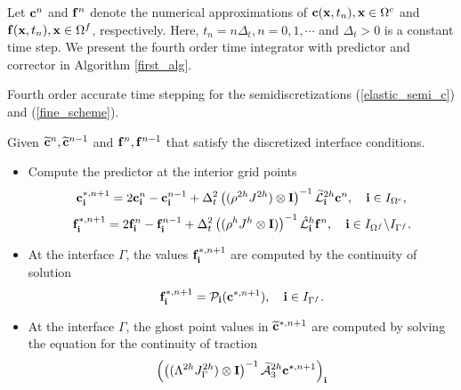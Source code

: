 Let ${\bf c}^{n}$ and ${\bf f}^{n}$ denote the numerical approximations of ${\bf c}({\bf x},t_n), {\bf x}\in\Omega^c$ and ${\bf f}({\bf x},t_n), {\bf x}\in\Omega^f$, respectively. Here, $t_n = n\Delta_t, n = 0,1,\cdots$ and $\Delta_t > 0$ is a constant time step. We present the fourth order time integrator with predictor and corrector in  Algorithm \ref{first_alg}.
~\\
\begin{breakablealgorithm}
	\caption{Fourth order accurate time stepping for the semidiscretizations  (\ref{elastic_semi_c}) and  (\ref{fine_scheme}). }\label{first_alg}
	Given  $\widetilde{{\bf c}}^{n}, \widetilde{{\bf c}}^{n-1}$ and ${\bf f}^{n}, {\bf f}^{n-1}$ that satisfy the discretized interface conditions.
	
	\begin{itemize}
		\item  {Compute the predictor at the interior grid points %
			\[{\bf c}^{*,n+1}_{\bf i} = 2{\bf c}^{n}_{\bf i} - {\bf c}^{n-1}_{\bf i} + \Delta_t^2\left((\rho^{2h}J^{2h})\otimes{\bf I}\right)^{-1}{\widetilde{\mathcal{L}}}^{2h}_{\bf i} {\bf{c}}^{n},\quad {\bf i}\in I_{\Omega^c},\]
			\[{\bf f}^{*,n+1}_{\bf i} = 2{\bf f}^{n}_{\bf i} - {\bf f}^{n-1}_{\bf i} + \Delta_t^2\left((\rho^{h}J^{h}\otimes{\bf I})\right)^{-1}\hat{\mathcal{L}}^{h}_{\bf i} {\bf{f}}^{n},\quad {\bf i}\in I_{\Omega^f}\backslash I_{\Gamma^f}.\]
		}
		\item{At the interface $\Gamma$, the values ${\bf f}^{*,n+1}_{\bf i}$  are computed by the continuity of solution 
			\begin{equation*}
			{\bf f}^{*,n+1}_{\bf i} = {\mathcal{P}}_{\bf i}({\bf c}^{*,n+1}),\quad {\bf i}\in I_{\Gamma^f}.
			\end{equation*}
		}
		\item{At the interface $\Gamma$, the ghost point values in $\widetilde{\bf c}^{*,n+1}$ are computed by solving the equation for the continuity of traction 
				\begin{equation}\label{traction_gamma_pre}
			\left(\left((\Lambda^{2h}J^{2h}_{\Gamma})\otimes{\bf I}\right)^{-1}\wt{\mathcal{A}}_3^{2h}{\bf c}^{\star,n+1}\right)_{\bf i}

\end{equation}}
\end{itemize}
\end{breakablealgorithm}
